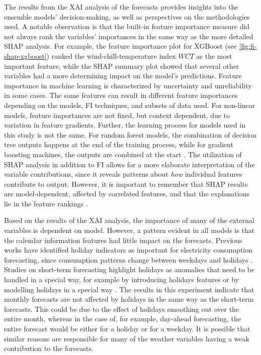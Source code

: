 The results from the XAI analysis of the forecasts provides insights into the ensemble models' decision-making, as well as perspectives on the methodologies used. A notable observation is that the built-in feature importance measure did not always rank the variables' importances in the same way as the more detailed SHAP analysis. For example, the feature importance plot for XGBoost (see \autoref{fig:fi-shap-xgboost}) ranked the wind-chill-temperature index $WCT$ as the most important feature, while the SHAP summary plot showed that several other variables had a more determining impact on the model's predictions. Feature importance in machine learning is characterized by uncertainty and unreliability in some cases. The same features can result in different feature importances depending on the models, FI techniques, and subsets of data used. For non-linear models, feature importances are not fixed, but context dependent, due to variation in feature gradients. Further, the learning process for models used in this study is not the same. For random forest models, the combination of decision tree outputs happens at the end of the training process, while for gradient boosting machines, the outputs are combined at the start \cite{rengasamy_feature_2022}. The utilization of SHAP analysis in addition to FI allows for a more elaborate interpretation of the variable contributions, since it reveals patterns about \emph{how} individual features contribute to output. However, it is important to remember that SHAP results are model-dependent, affected by correlated features, and that the explanations lie in the feature rankings \cite{salih_perspective_2025}.

Based on the results of the XAI analysis, the importance of many of the external variables is dependent on model. However, a pattern evident in all models is that the calendar information features had little impact on the forecasts. Previous works have identified holiday indicators as important for electricity consumption forecasting, since consumption patterns change between weekdays and holidays \cite{roman_holidays_2015}. Studies on short-term forecasting highlight holidays as anomalies that need to be handled in a special way, for example by introducing holidays features or by modelling holidays in a special way \cite{moon_advancing_2024,kang_off_2022,trull_one-day-ahead_2021}. The results in this experiment indicate that monthly forecasts are not affected by holidays in the same way as the short-term forecasts. This could be due to the effect of holidays smoothing out over the entire month, whereas in the case of, for example, day-ahead forecasting, the entire forecast would be either for a holiday or for a weekday. It is possible that similar reasons are responsible for many of the weather variables having a weak contribution to the forecasts.

